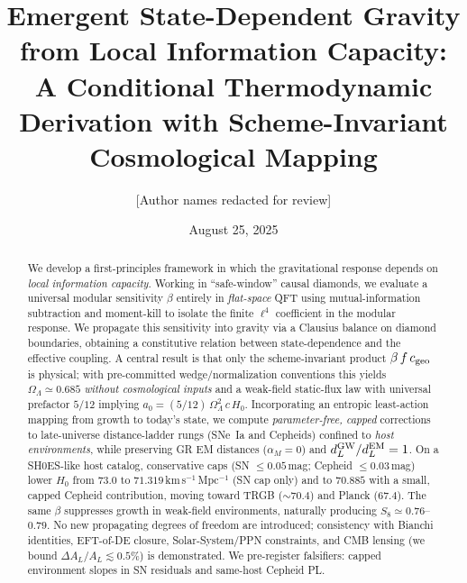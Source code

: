 \documentclass[aps,prd,preprint,onecolumn,longbibliography,nofootinbib]{revtex4-2}
\theoremstyle{plain}
\theoremstyle{remark}
\newcommand{\OmL}{\Omega_\Lambda}
\newcommand{\Hzero}{H_0}
\newcommand{\alM}{\alpha_{\!M}}
\newcommand{\be}{\beta}
\begin{document}
\title{Emergent State-Dependent Gravity from Local Information Capacity:\\
A Conditional Thermodynamic Derivation with Scheme-Invariant Cosmological Mapping}

\author{[Author names redacted for review]}

\date{August 25, 2025}

\begin{abstract}
We develop a first-principles framework in which the gravitational response depends on \emph{local information capacity}. Working in ``safe-window'' causal diamonds, we evaluate a universal modular sensitivity $\be$ entirely in \emph{flat-space} QFT using mutual-information subtraction and moment-kill to isolate the finite $\ell^4$ coefficient in the modular response. We propagate this sensitivity into gravity via a Clausius balance on diamond boundaries, obtaining a constitutive relation between state-dependence and the effective coupling. A central result is that only the scheme-invariant product $\be\,f\,c_{\rm geo}$ is physical; with pre-committed wedge/normalization conventions this yields $\OmL \simeq 0.685$ \emph{without cosmological inputs} and a weak-field static-flux law with universal prefactor $5/12$ implying $a_0=(5/12)\,\OmL^2\,c\,\Hzero$. Incorporating an entropic least-action mapping from growth to today's state, we compute \emph{parameter-free, capped} corrections to late-universe distance-ladder rungs (SNe~Ia and Cepheids) confined to \emph{host environments}, while preserving GR EM distances ($\alM=0$) and $d_L^{\rm GW}/d_L^{\rm EM}=1$. On a SH0ES-like host catalog, conservative caps (SN $\le 0.05$\,mag; Cepheid $\le 0.03$\,mag) lower $\Hzero$ from $73.0$ to $71.319$\,km\,s$^{-1}$\,Mpc$^{-1}$ (SN cap only) and to $70.885$ with a small, capped Cepheid contribution, moving toward TRGB ($\sim 70.4$) and Planck ($67.4$). The same $\be$ suppresses growth in weak-field environments, naturally producing $S_8 \simeq 0.76$--$0.79$. No new propagating degrees of freedom are introduced; consistency with Bianchi identities, EFT-of-DE closure, Solar-System/PPN constraints, and CMB lensing (we bound $\Delta A_L/A_L\!\lesssim\!0.5\%$) is demonstrated. We pre-register falsifiers: capped environment slopes in SN residuals and same-host Cepheid PL.
\end{abstract}

\maketitle
\end{document}
